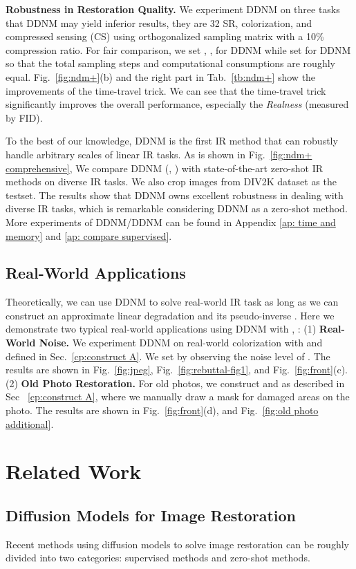 \documentclass{article} \usepackage{iclr2023_conference,times}
\begin{document}
\textbf{Robustness in Restoration Quality.} We experiment DDNM on three tasks that DDNM may yield inferior results, they are 32 SR, colorization, and compressed sensing (CS) using orthogonalized sampling matrix with a 10\% compression ratio. For fair comparison, we set , ,  for DDNM while set  for DDNM so that the total sampling steps and computational consumptions are roughly equal. Fig.~\ref{fig:ndm+}(b) and the right part in Tab.~\ref{tb:ndm+} show the improvements of the time-travel trick. We can see that the time-travel trick significantly improves the overall performance, especially the \textit{Realness} (measured by FID).

To the best of our knowledge, DDNM is the first IR method that can robustly handle arbitrary scales of linear IR tasks. As is shown in Fig.~\ref{fig:ndm+ comprehensive}, We compare DDNM (, ) with state-of-the-art zero-shot IR methods on diverse IR tasks. We also crop images from DIV2K dataset \citep{div2k} as the testset. The results show that DDNM owns excellent robustness in dealing with diverse IR tasks, which is remarkable considering DDNM as a zero-shot method. More experiments of DDNM/DDNM can be found in Appendix \ref{ap: time and memory} and \ref{ap: compare supervised}.

\subsection{Real-World Applications}
Theoretically, we can use DDNM to solve real-world IR task as long as we can construct an approximate linear degradation  and its pseudo-inverse . Here we demonstrate two typical real-world applications using DDNM with , : (1) \textbf{Real-World Noise.} We experiment DDNM on real-world colorization with  and  defined in Sec.~\ref{cp:construct A}. We set  by observing the noise level of . The results are shown in Fig.~\ref{fig:jpeg}, Fig.~\ref{fig:rebuttal-fig1}, and Fig.~\ref{fig:front}(c). (2) \textbf{Old Photo Restoration.}  For old photos, we construct  and  as described in Sec ~\ref{cp:construct A}, where we manually draw a mask for damaged areas on the photo. The results are shown in Fig.~\ref{fig:front}(d), and Fig.~\ref{fig:old photo additional}.



\section{Related Work}
\subsection{Diffusion Models for Image Restoration}
Recent methods using diffusion models to solve image restoration can be roughly divided into two categories: supervised methods and zero-shot methods.
\end{document}
